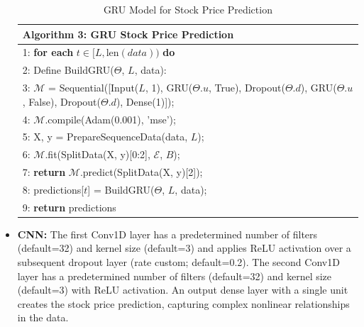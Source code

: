 \begin{itemize}
    \begin{table}[h]
    \small
    \centering
    \begin{tabular}{|p{10cm}|}
    \hline
    \textbf{Algorithm 3: GRU Stock Price Prediction} \\
    \hline
    1: \textbf{for each} $t \in [L, \text{len}(data))$ \textbf{do} \\
    2: \quad Define BuildGRU($\Theta$, $L$, data): \\
    3: \quad\quad $\mathcal{M}$ = Sequential([Input($L$, 1), GRU($\Theta.u$, True), Dropout($\Theta.d$), GRU($\Theta.u$, False), Dropout($\Theta.d$), Dense(1)]); \\
    4: \quad\quad $\mathcal{M}$.compile(Adam(0.001), 'mse'); \\
    5: \quad\quad X, y = PrepareSequenceData(data, $L$); \\
    6: \quad\quad $\mathcal{M}$.fit(SplitData(X, y)[0:2], $\mathcal{E}$, $B$); \\
    7: \quad\quad \textbf{return} $\mathcal{M}$.predict(SplitData(X, y)[2]); \\
    8: \quad predictions[$t$] = BuildGRU($\Theta$, $L$, data); \\
    9: \textbf{return} predictions \\
    \hline
    \end{tabular}
    \caption{GRU Model for Stock Price Prediction}
    \label{tab:gru_predictor}
    \end{table}
    
    \item \textbf{CNN: }  The first Conv1D layer has a predetermined number of filters (default=32) and kernel size (default=3) and applies ReLU activation over a subsequent dropout layer (rate custom; default=0.2). The second Conv1D layer has a predetermined number of filters (default=32) and kernel size (default=3) with ReLU activation. An output dense layer with a single unit creates the stock price prediction, capturing complex nonlinear relationships in the data.
    

\end{itemize}
